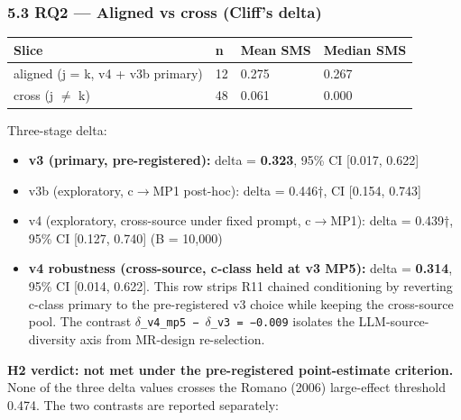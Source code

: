 \documentclass[review,12pt,authoryear]{elsarticle}
\providecommand{\tightlist}{\setlength{\itemsep}{0pt}\setlength{\parskip}{0pt}}
\newcounter{none}                   %
\begin{document}
\subsubsection{5.3 RQ2 --- Aligned vs cross (Cliff's
delta)}\label{rq2-aligned-vs-cross-cliffs-delta}

{\def\LTcaptype{none} %
\begin{longtable}[]{@{}llll@{}}
\toprule\noalign{}
Slice & n & Mean SMS & Median SMS \\
\midrule\noalign{}
\endhead
\bottomrule\noalign{}
\endlastfoot
aligned (j = k, v4 + v3b primary) & 12 & 0.275 & 0.267 \\
cross (j $\neq$ k) & 48 & 0.061 & 0.000 \\
\end{longtable}
}

Three-stage delta:

\begin{itemize}
\tightlist
\item
  \textbf{v3 (primary, pre-registered):} delta = \textbf{0.323}, 95\% CI
  {[}0.017, 0.622{]}
\item
  v3b (exploratory, c$\to$MP1 post-hoc): delta = 0.446†, CI {[}0.154,
  0.743{]}
\item
  v4 (exploratory, cross-source under fixed prompt, c$\to$MP1): delta =
  0.439†, 95\% CI {[}0.127, 0.740{]} (B = 10,000)
\item
  \textbf{v4 robustness (cross-source, c-class held at v3 MP5):} delta =
  \textbf{0.314}, 95\% CI {[}0.014, 0.622{]}. This row strips R11
  chained conditioning by reverting c-class primary to the
  pre-registered v3 choice while keeping the cross-source pool. The
  contrast \texttt{$\delta$\_v4\_mp5\ −\ $\delta$\_v3\ =\ −0.009} isolates the
  LLM-source-diversity axis from MR-design re-selection.
\end{itemize}

\textbf{H2 verdict: not met under the pre-registered point-estimate
criterion.} None of the three delta values crosses the Romano (2006)
large-effect threshold 0.474. The two contrasts are reported separately:
\end{document}
